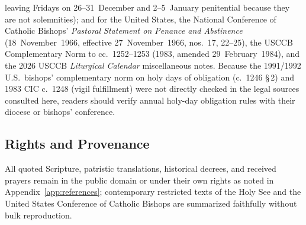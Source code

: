 \begin{itemize}
leaving Fridays on 26--31~December and 2--5~January penitential because they are
not solemnities); and for the United States, the National Conference of Catholic
Bishops' \textit{Pastoral Statement on Penance and Abstinence}
(18~November~1966, effective 27~November~1966, nos.~17, 22--25), the USCCB
Complementary Norm to cc.~1252--1253 (1983, amended 29~February~1984), and the
2026 USCCB \textit{Liturgical Calendar} miscellaneous notes. Because the
1991/1992 U.S.\ bishops' complementary norm on holy days of obligation
(c.~1246 \S\,2) and 1983 CIC c.~1248 (vigil fulfillment) were not directly
checked in the legal sources consulted here, readers should verify annual
holy-day obligation rules with their diocese or bishops' conference.
\end{itemize}

\subsection{Rights and Provenance}

All quoted Scripture, patristic translations, historical decrees, and received
prayers remain in the public domain or under their own rights as noted in
Appendix~\ref{app:references}; contemporary restricted texts of the Holy See and
the United States Conference of Catholic Bishops are summarized faithfully
without bulk reproduction.
